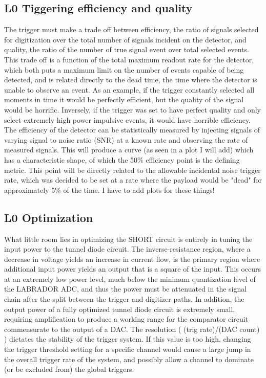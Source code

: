 	\subsection{L0 Tiggering efficiency and quality}
		The trigger must make a trade off between efficiency, the ratio of signals selected for digitization over the total number of signals incident on the detector, and quality, the ratio of the number of true signal event over total selected events.  This trade off is a function of the total maximum readout rate for the detector, which both puts a maximum limit on the number of events capable of being detected, and is related directly to the dead time, the time where the detector is unable to observe an event.  As an example, if the trigger constantly selected all moments in time it would be perfectly efficient, but the quality of the signal would be horrific.  Inversely, if the trigger was set to have perfect quality and only select extremely high power impulsive events, it would have horrible efficiency.  The efficiency of the detector can be statistically measured by injecting signals of varying signal to noise ratio (SNR) at a known rate and observing the rate of measured signals.  This will produce a curve (as seen in a plot I will add) which has a characteristic shape, of which the 50\% efficiency point is the defining metric.  This point will be directly related to the allowable incidental noise trigger rate, which was decided to be set at a rate where the payload would be "dead" for approximately 5\% of the time.  I have to add plots for these things!
	\subsection{L0 Optimization}
		What little room lies in optimizing the SHORT circuit is entirely in tuning the input power to the tunnel diode circuit.  The inverse-resistance region, where a decrease in voltage yields an increase in current flow, is the primary region where additional input power yields an output that is a square of the input.  This occurs at an extremely low power level, much below the minimum quantization level of the LABRADOR ADC, and thus the power must be attenuated in the signal chain after the split between the trigger and digitizer paths.  In addition, the output power of a fully optimized tunnel diode circuit is extremely small,	requiring amplification to produce a working range for the comparator circuit commensurate to the output of a DAC.  The resolution ( (trig rate)/(DAC count) ) dictates the stability of the trigger system.  If this value is too high, changing the trigger threshold setting for a specific channel would cause a large jump in the overall trigger rate of the system, and possibly allow a channel to dominate (or be excluded from) the global triggers.
